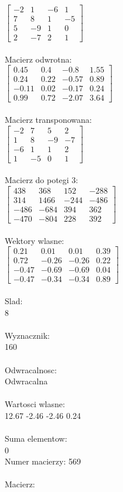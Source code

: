 \documentclass[a4paper,12pt]{article}
\begin{document}
$\begin{bmatrix} -2&1&-6&1\\7&8&1&-5\\5&-9&1&0\\2&-7&2&1 \end{bmatrix}$
\\
\\
Macierz odwrotna:\\

$\begin{bmatrix} 0.45&0.4&-0.8&1.55\\0.24&0.22&-0.57&0.89\\-0.11&0.02&-0.17&0.24\\0.99&0.72&-2.07&3.64 \end{bmatrix}$
\\
\\
Macierz transponowana:\\

$\begin{bmatrix} -2&7&5&2\\1&8&-9&-7\\-6&1&1&2\\1&-5&0&1 \end{bmatrix}$
\\
\\
Macierz do potegi 3:\\

$\begin{bmatrix} 438&368&152&-288\\314&1466&-244&-486\\-486&-684&394&362\\-470&-804&228&392 \end{bmatrix}$
\\
\\
Wektory wlasne:\\

$\begin{bmatrix} 0.21&0.01&0.01&0.39\\0.72&-0.26&-0.26&0.22\\-0.47&-0.69&-0.69&0.04\\-0.47&-0.34&-0.34&0.89 \end{bmatrix}$
\\
\\
Slad:\\
8
\\
\\
Wyznacznik:\\
160
\\
\\
Odwracalnosc:\\
Odwracalna
\\
\\
Wartosci wlasne:\\
12.67 -2.46 -2.46 0.24
\\
\\
Suma elementow:\\
0
\\
\newpage
Numer macierzy:
569
\\
\\
Macierz:\\
\end{document}
